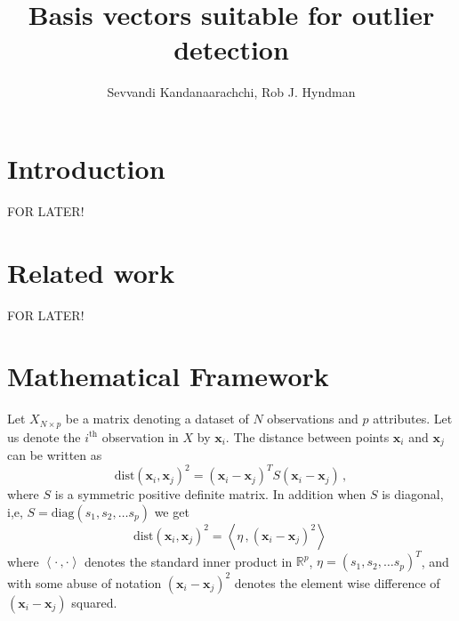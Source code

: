 \documentclass[11pt]{article}
\newcommand{\dist}{\text{dist}}
\newcommand{\diag}{\text{diag}}
\begin{document}
\title{Basis vectors suitable for outlier detection}
\author{Sevvandi Kandanaarachchi, Rob J. Hyndman}
\maketitle
{}

\section{Introduction}
FOR LATER!

\section{Related work}
FOR LATER!

\section{Mathematical Framework}\label{sec:MathFrame}
Let $X_{N \times p}$ be a matrix denoting a dataset of $N$ observations and $p$ attributes. Let us denote the  $i^{\text{th}}$ observation in $X$ by $\bm{x}_i$. The  distance between points $\bm{x}_i$ and $\bm{x}_j$  can be written as 
\begin{equation}\label{eq:secMF1}
\dist(\bm{x}_i, \bm{x}_j)^2 = \left( \bm{x}_i - \bm{x}_j \right)^T S \left( \bm{x}_i - \bm{x}_j \right) \, , 
\end{equation}
where $S$ is a symmetric positive definite matrix. In addition when $S$ is diagonal, i,e, $S = \diag(s_1, s_2, \ldots s_p)$ we get
\begin{equation}\label{eq:secMF2}
    \dist(\bm{x}_i, \bm{x}_j)^2 = \left\langle \eta\, ,  \left( \bm{x}_i - \bm{x}_j \right)^2 \right\rangle\, 
\end{equation}
where $\left\langle \cdot\, , \cdot \right\rangle$ denotes the standard inner product in $\mathbb{R}^p$,   $\eta = \left(s_1, s_2, \ldots s_p\right)^T$, and with some abuse of notation $\left( \bm{x}_i - \bm{x}_j \right)^2$ denotes the element wise difference of $\left( \bm{x}_i - \bm{x}_j \right)$ squared.
\end{document}
